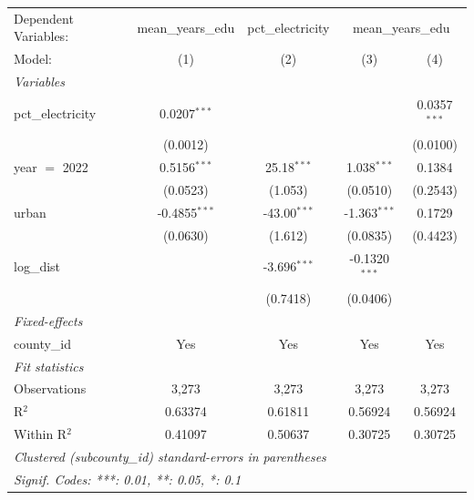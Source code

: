 
\begingroup
\centering
\begin{tabular}{lcccc}
   \tabularnewline \midrule \midrule
   Dependent Variables: & mean\_years\_edu & pct\_electricity & \multicolumn{2}{c}{mean\_years\_edu}\\
   Model:            & (1)             & (2)            & (3)             & (4)\\  
   \midrule
   \emph{Variables}\\
   pct\_electricity  & 0.0207$^{***}$  &                &                 & 0.0357$^{***}$\\   
                     & (0.0012)        &                &                 & (0.0100)\\   
   year $=$ 2022     & 0.5156$^{***}$  & 25.18$^{***}$  & 1.038$^{***}$   & 0.1384\\   
                     & (0.0523)        & (1.053)        & (0.0510)        & (0.2543)\\   
   urban             & -0.4855$^{***}$ & -43.00$^{***}$ & -1.363$^{***}$  & 0.1729\\   
                     & (0.0630)        & (1.612)        & (0.0835)        & (0.4423)\\   
   log\_dist         &                 & -3.696$^{***}$ & -0.1320$^{***}$ &   \\   
                     &                 & (0.7418)       & (0.0406)        &   \\   
   \midrule
   \emph{Fixed-effects}\\
   county\_id        & Yes             & Yes            & Yes             & Yes\\  
   \midrule
   \emph{Fit statistics}\\
   Observations      & 3,273           & 3,273          & 3,273           & 3,273\\  
   R$^2$             & 0.63374         & 0.61811        & 0.56924         & 0.56924\\  
   Within R$^2$      & 0.41097         & 0.50637        & 0.30725         & 0.30725\\  
   \midrule \midrule
   \multicolumn{5}{l}{\emph{Clustered (subcounty\_id) standard-errors in parentheses}}\\
   \multicolumn{5}{l}{\emph{Signif. Codes: ***: 0.01, **: 0.05, *: 0.1}}\\
\end{tabular}
\par\endgroup


